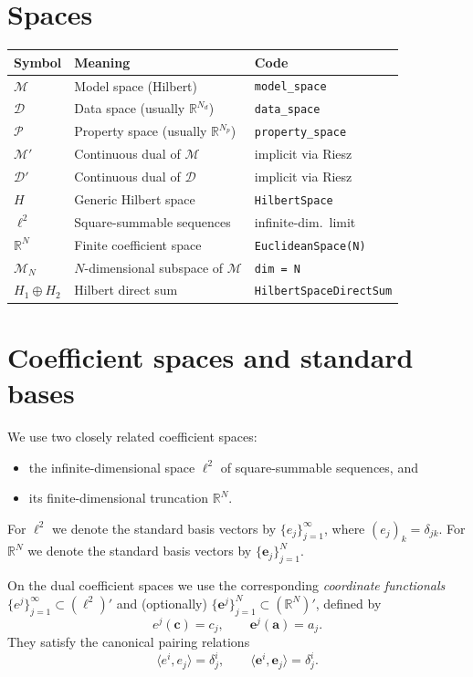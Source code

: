 \documentclass[11pt,twoside,openright]{book}
\theoremstyle{plain}
\theoremstyle{definition}
\theoremstyle{remark}
\newcommand{\modelspace}{\mathcal{M}}
\newcommand{\dataspace}{\mathcal{D}}
\begin{document}
\section*{Spaces}

\begin{longtable}{lll}
\toprule
Symbol & Meaning & Code \\
\midrule
$\modelspace$ & Model space (Hilbert) & \texttt{model\_space} \\
$\dataspace$ & Data space (usually $\mathbb{R}^{N_d}$) & \texttt{data\_space} \\
$\mathcal{P}$ & Property space (usually $\mathbb{R}^{N_p}$) & \texttt{property\_space} \\
$\modelspace'$ & Continuous dual of $\modelspace$ & implicit via Riesz \\
$\dataspace'$ & Continuous dual of $\dataspace$ & implicit via Riesz \\
$H$ & Generic Hilbert space & \texttt{HilbertSpace} \\
$\ell^2$ & Square-summable sequences & infinite-dim.~limit \\
$\mathbb{R}^N$ & Finite coefficient space & \texttt{EuclideanSpace(N)} \\
$\modelspace_N$ & $N$-dimensional subspace of $\modelspace$ & \texttt{dim = N} \\
$H_1 \oplus H_2$ & Hilbert direct sum & \texttt{HilbertSpaceDirectSum} \\
\bottomrule
\end{longtable}

\section*{Coefficient spaces and standard bases}

We use two closely related coefficient spaces:
\begin{itemize}
  \item the infinite-dimensional space $\ell^2$ of square-summable sequences, and
  \item its finite-dimensional truncation $\mathbb{R}^N$.
\end{itemize}
For $\ell^2$ we denote the standard basis vectors by $\{e_j\}_{j=1}^\infty$, where
$(e_j)_k = \delta_{jk}$. For $\mathbb{R}^N$ we denote the standard basis vectors by
$\{\mathbf{e}_j\}_{j=1}^N$.

On the dual coefficient spaces we use the corresponding \emph{coordinate functionals}
$\{e^j\}_{j=1}^\infty \subset (\ell^2)'$ and (optionally) $\{\mathbf{e}^j\}_{j=1}^N \subset (\mathbb{R}^N)'$, defined by
\[
  e^j(\mathbf{c}) = c_j, \qquad \mathbf{e}^j(\mathbf{a}) = a_j.
\]
They satisfy the canonical pairing relations
\[
  \langle e^i, e_j\rangle = \delta^i_j, \qquad \langle \mathbf{e}^i, \mathbf{e}_j\rangle = \delta^i_j.
\]
\end{document}
